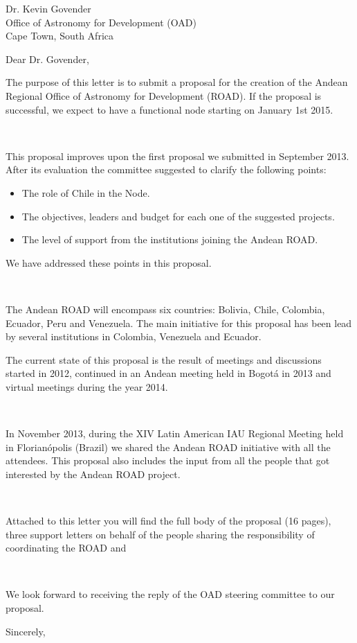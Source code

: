 \documentclass[a4paper,DIN]{scrlttr2}
\begin{document}
\begin{letter}{%
Dr. Kevin Govender\\
Office of Astronomy for Development (OAD)\\
Cape Town, South Africa
}

\opening{Dear Dr. Govender,}


The purpose of this letter is to submit a proposal for the creation of
the Andean Regional Office of Astronomy for Development (ROAD). If the
proposal is successful, we expect to have a functional node starting
on January 1st 2015.

\

\noindent
This proposal improves upon the first proposal we submitted in
September 2013.  After its evaluation the committee suggested to clarify the
following points:

\begin{itemize}
\item The role of Chile in the Node. 
\item The objectives, leaders and budget for each one of the suggested
  projects.
\item The level of support from the institutions joining the
  Andean ROAD.
\end{itemize} 

\noindent
We have addressed these points in this proposal.

\

\noindent
The Andean ROAD will encompass six countries: Bolivia, Chile, Colombia,
Ecuador, Peru and Venezuela. The main initiative for this proposal has
been lead by several institutions in Colombia, Venezuela and
Ecuador. 

\noindent
The current state of this proposal is the result of meetings
and discussions started in 2012, continued in an Andean meeting held
in Bogot\'a in 2013 and virtual meetings during the year 2014.


\

\noindent
In November 2013, during the XIV Latin American IAU Regional Meeting
held in Florian\'opolis (Brazil) we shared the Andean ROAD initiative
with all the attendees. This proposal also includes the input from all
the people that got interested by the Andean ROAD project. 

\

\noindent
Attached to this letter you will find the full body of the proposal
(16 pages), three support letters on behalf of the people sharing
the responsibility of coordinating the ROAD and 

\

\noindent
We look forward to receiving the reply of the OAD steering committee
to our proposal.


\closing{Sincerely,}

\vspace{-1cm}
\end{letter}
\end{document}
